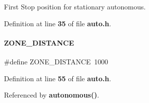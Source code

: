First Stop position for stationary autonomous. 



Definition at line \textbf{ 35} of file \textbf{ auto.\+h}.

\mbox{\label{a00002_abe0d1da59836694bca507d0a5b61423b}} 
\paragraph{Z\+O\+N\+E\+\_\+\+D\+I\+S\+T\+A\+N\+CE}
{\footnotesize\ttfamily \#define Z\+O\+N\+E\+\_\+\+D\+I\+S\+T\+A\+N\+CE~1000}



Definition at line \textbf{ 55} of file \textbf{ auto.\+h}.



Referenced by \textbf{ autonomous()}.

